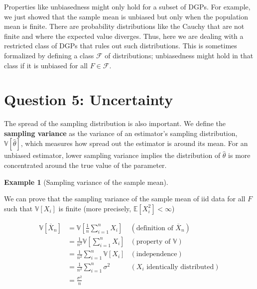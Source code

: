 \documentclass[
  13pt,
  letterpaper,
  DIV=11,
  numbers=noendperiod]{scrreprt}
\newcommand{\E}{\mathbb{E}}
\newcommand{\V}{\mathbb{V}}
\newcommand{\Xbar}{\overline{X}}
\theoremstyle{definition}
\theoremstyle{definition}
\newtheorem{example}{Example}[chapter]
\theoremstyle{plain}
\theoremstyle{remark}
\begin{document}
\begin{tcolorbox}[enhanced jigsaw, leftrule=.75mm, colbacktitle=quarto-callout-warning-color!10!white, title=\textcolor{quarto-callout-warning-color}{\faExclamationTriangle}\hspace{0.5em}{Warning}, toptitle=1mm, breakable, left=2mm, toprule=.15mm, arc=.35mm, opacitybacktitle=0.6, opacityback=0, colback=white, rightrule=.15mm, titlerule=0mm, colframe=quarto-callout-warning-color-frame, bottomtitle=1mm, bottomrule=.15mm, coltitle=black]

Properties like unbiasedness might only hold for a subset of DGPs. For
example, we just showed that the sample mean is unbiased but only when
the population mean is finite. There are probability distributions like
the Cauchy that are not finite and where the expected value diverges.
Thus, here we are dealing with a restricted class of DGPs that rules out
such distributions. This is sometimes formalized by defining a class
\(\mathcal{F}\) of distributions; unbiasedness might hold in that class
if it is unbiased for all \(F \in \mathcal{F}\).

\end{tcolorbox}

\section{Question 5: Uncertainty}\label{question-5-uncertainty-1}

The spread of the sampling distribution is also important. We define the
\textbf{sampling variance} as the variance of an estimator's sampling
distribution, \(\V[\widehat{\theta}]\), which measures how spread out
the estimator is around its mean. For an unbiased estimator, lower
sampling variance implies the distribution of \(\widehat{\theta}\) is
more concentrated around the true value of the parameter.

\begin{example}[Sampling variance of the sample
mean]\protect\hypertarget{exm-mean-var}{}\label{exm-mean-var}

We can prove that the sampling variance of the sample mean of iid data
for all \(F\) such that \(\V[X_i]\) is finite (more precisely,
\(\E[X_i^2] < \infty\))

\[\begin{aligned}
  \V\left[ \Xbar_n \right] &= \V\left[ \frac{1}{n} \sum_{i=1}^n X_i \right] & (\text{definition of } \Xbar_n) \\
                           &= \frac{1}{n^2} \V\left[ \sum_{i=1}^n X_i \right] & (\text{property of } \V) \\
                           &= \frac{1}{n^2} \sum_{i=1}^n \V[X_i] & (\text{independence}) \\
                           &= \frac{1}{n^2} \sum_{i=1}^n \sigma^2 & (X_i \text{ identically distributed}) \\
                           &= \frac{\sigma^2}{n}
\end{aligned}\]

\end{example}
\end{document}
